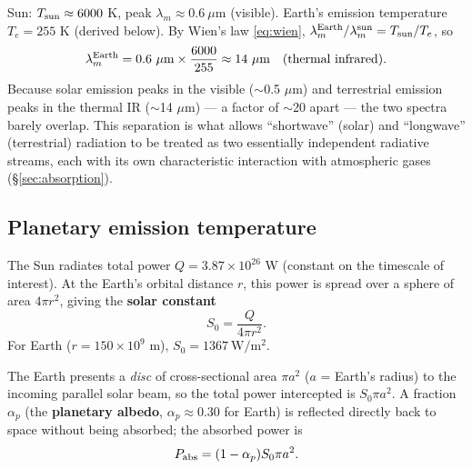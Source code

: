 \documentclass[11pt]{article}
\begin{document}
\begin{worked}
Sun: $T_{\rm sun}\approx6000$ K, peak $\lambda_m\approx0.6\ \mu$m (visible). Earth's emission temperature $T_e=255$ K (derived below). By Wien's law \eqref{eq:wien}, $\lambda_m^{\rm Earth}/\lambda_m^{\rm sun} = T_{\rm sun}/T_e$, so
\[
\lambda_m^{\rm Earth} = 0.6\ \mu\text{m}\times\frac{6000}{255} \approx 14\ \mu\text{m} \quad(\text{thermal infrared}).
\]
Because solar emission peaks in the visible ($\sim$0.5 $\mu$m) and terrestrial emission peaks in the thermal IR ($\sim$14 $\mu$m) — a factor of $\sim$20 apart — the two spectra barely overlap. This separation is what allows ``shortwave'' (solar) and ``longwave'' (terrestrial) radiation to be treated as two essentially independent radiative streams, each with its own characteristic interaction with atmospheric gases (\S\ref{sec:absorption}).
\end{worked}

\subsection{Planetary emission temperature}
\label{sec:Te}

The Sun radiates total power $Q=3.87\times10^{26}$ W (constant on the timescale of interest). At the Earth's orbital distance $r$, this power is spread over a sphere of area $4\pi r^2$, giving the \textbf{solar constant}
\begin{equation}
S_0 = \frac{Q}{4\pi r^2}.
\end{equation}
For Earth ($r=150\times10^9$ m), $S_0=1367\ \si{\watt\per\square\m}$.

The Earth presents a \emph{disc} of cross-sectional area $\pi a^2$ ($a$ = Earth's radius) to the incoming parallel solar beam, so the total power intercepted is $S_0\pi a^2$. A fraction $\alpha_p$ (the \textbf{planetary albedo}, $\alpha_p\approx0.30$ for Earth) is reflected directly back to space without being absorbed; the absorbed power is
\begin{equation}
P_{\rm abs} = (1-\alpha_p)S_0\pi a^2.
\label{eq:Pabs}
\end{equation}
\end{document}
